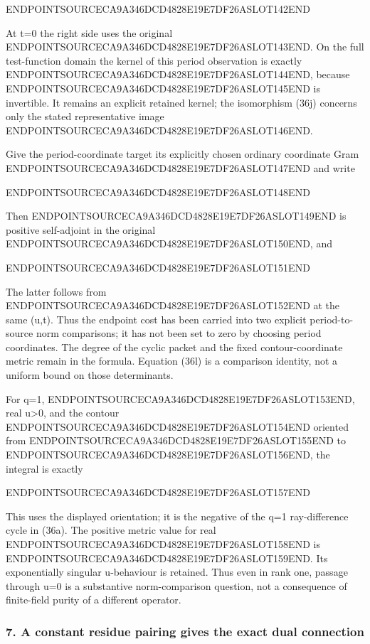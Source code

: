 ENDPOINTSOURCECA9A346DCD4828E19E7DF26ASLOT142END

At t=0 the right side uses the original ENDPOINTSOURCECA9A346DCD4828E19E7DF26ASLOT143END. On the full test-function domain the kernel of this period observation is exactly ENDPOINTSOURCECA9A346DCD4828E19E7DF26ASLOT144END, because ENDPOINTSOURCECA9A346DCD4828E19E7DF26ASLOT145END is invertible. It remains an explicit retained kernel; the isomorphism (36j) concerns only the stated representative image ENDPOINTSOURCECA9A346DCD4828E19E7DF26ASLOT146END.

Give the period-coordinate target its explicitly chosen ordinary coordinate Gram ENDPOINTSOURCECA9A346DCD4828E19E7DF26ASLOT147END and write

ENDPOINTSOURCECA9A346DCD4828E19E7DF26ASLOT148END

Then ENDPOINTSOURCECA9A346DCD4828E19E7DF26ASLOT149END is positive self-adjoint in the original ENDPOINTSOURCECA9A346DCD4828E19E7DF26ASLOT150END, and

ENDPOINTSOURCECA9A346DCD4828E19E7DF26ASLOT151END

The latter follows from ENDPOINTSOURCECA9A346DCD4828E19E7DF26ASLOT152END at the same (u,t). Thus the endpoint cost has been carried into two explicit period-to-source norm comparisons; it has not been set to zero by choosing period coordinates. The degree of the cyclic packet and the fixed contour-coordinate metric remain in the formula. Equation (36l) is a comparison identity, not a uniform bound on those determinants.

For q=1, ENDPOINTSOURCECA9A346DCD4828E19E7DF26ASLOT153END, real u\textgreater0, and the contour ENDPOINTSOURCECA9A346DCD4828E19E7DF26ASLOT154END oriented from ENDPOINTSOURCECA9A346DCD4828E19E7DF26ASLOT155END to ENDPOINTSOURCECA9A346DCD4828E19E7DF26ASLOT156END, the integral is exactly

ENDPOINTSOURCECA9A346DCD4828E19E7DF26ASLOT157END

This uses the displayed orientation; it is the negative of the q=1 ray-difference cycle in (36a). The positive metric value for real ENDPOINTSOURCECA9A346DCD4828E19E7DF26ASLOT158END is ENDPOINTSOURCECA9A346DCD4828E19E7DF26ASLOT159END. Its exponentially singular u-behaviour is retained. Thus even in rank one, passage through u=0 is a substantive norm-comparison question, not a consequence of finite-field purity of a different operator.

\subsubsection{7. A constant residue pairing gives the exact dual connection}\label{endpoint-exponential_original--a-constant-residue-pairing-gives-the-exact-dual-connection}

